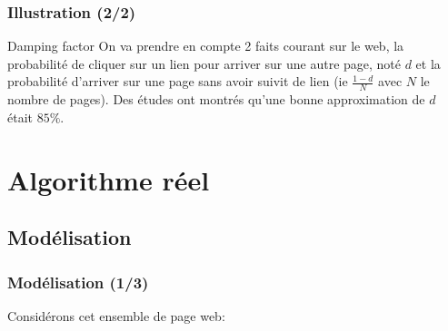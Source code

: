 \documentclass{beamer}
\begin{document}
\begin{frame}
  \frametitle{Illustration (2/2)}

  \begin{block}{Damping factor}
    On va prendre en compte 2 faits courant sur le web, la probabilité
    de cliquer sur un lien pour arriver sur une autre page, noté $d$ et
    la probabilité d'arriver sur une page sans avoir suivit de lien (ie
    $\frac{1 - d}{N}$ avec $N$ le nombre de pages). Des études ont
    montrés qu'une bonne approximation de $d$ était $85\%$.
  \end{block}
\end{frame}

\section{Algorithme réel}
\subsection{Modélisation}

\begin{frame}
  \tableofcontents[currentsection,subsectionstyle=hide]
\end{frame}

\begin{frame}
  \frametitle{Modélisation (1/3)}

  Considérons cet ensemble de page web:\\\ \\
  \\
\end{frame}
\end{document}
